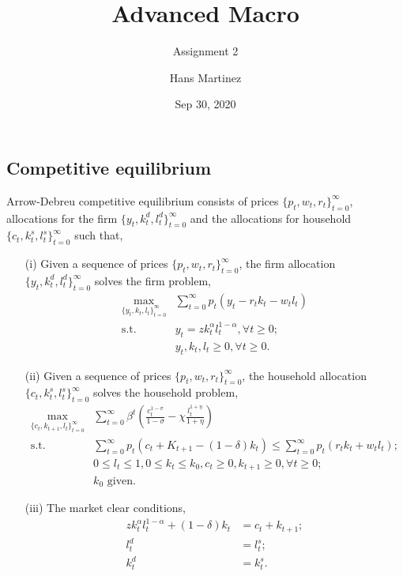 \documentclass[]{article}
\title{Advanced Macro}
\subtitle{Assignment 2}
\author{Hans Martinez}
\date{Sep 30, 2020}
\begin{document}
\maketitle

        \subsection{Competitive equilibrium}
            \indent Arrow-Debreu competitive equilibrium consists of prices $\{p_t,w_t,r_t\}_{t=0}^{\infty}$, allocations for the firm $\{y_t,k_t^d,l_t^d\}_{t=0}^{\infty}$ and the allocations for household $\{c_t,k_t^s,l_t^s\}_{t=0}^{\infty}$ such that,
            \begin{itemize}
            \item[(i)] Given a sequence of prices $\{p_t,w_t,r_t\}_{t=0}^{\infty}$, the firm allocation $\{y_t,k_t^d,l_t^d\}_{t=0}^{\infty}$ solves the firm problem,
            \begin{equation}
            \begin{split}
                \max_{\{y_t,k_t,l_t\}_{t=0}^{\infty}}&\sum_{t=0}^{\infty}
                p_t(y_t-r_tk_t-w_tl_t)\\
                \text{s.t.  }&y_t=zk_t^{\alpha}l_t^{1-\alpha}, \forall t\geq 0;\\
                &y_t,k_t,l_t\geq 0, \forall t \geq 0.
            \end{split}
            \end{equation}
            
            \item[(ii)] Given a sequence of prices $\{p_t,w_t,r_t\}_{t=0}^{\infty}$, the household allocation $\{c_t,k_t^s,l_t^s\}_{t=0}^{\infty}$ solves the household problem,
            \begin{equation}
            \begin{split}
                \max_{\{c_t,k_{t+1},l_t\}_{t=0}^{\infty}}&\sum_{t=0}^{\infty}
                \beta ^t(\frac{c_t^{1-\sigma}}{1-\sigma}-\chi \frac{l_t^{1+\eta}}{1+\eta})\\
                \text{s.t.  }& \sum_{t=0}^{\infty}p_t(c_t+K_{t+1}-(1-\delta)k_t)
                \leq\sum_{t=0}^{\infty}p_t(r_tk_t+w_tl_t);\\
                &0\leq l_t\leq 1,0\leq k_t\leq k_0, c_t\geq 0, k_{t+1}\geq 0,\forall t \geq 0;\\
                &k_0 \text{ given.}
            \end{split}
            \end{equation}
            
            \item[(iii)] The market clear conditions,
            \begin{equation*}
            \begin{split}
                zk_t^{\alpha}l_t^{1-\alpha}+(1-\delta)k_t&=c_t+k_{t+1} ;\\
                l_t^d&=l_t^s    ;\\
                k_t^d&=k_t^s    .
            \end{split}
            \end{equation*}
            \end{itemize}
        
\end{document}
